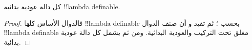 \documentclass[../../../include/open-logic-section]{subfiles}
\begin{document}
\begin{prop}
  كل دالة عودية بدائية !!{lambda definable}.
\end{prop}

\begin{proof}
  فالدوال الأساس كلها !!{lambda definable} بحسب ؛
  ثم تفيد  و أن صنف الدوال
  !!{lambda definable} مغلق تحت التركيب والعودية البدائية. ومن ثم
  يشمل كل دالة عودية بدائية.
\end{proof}
\end{document}
